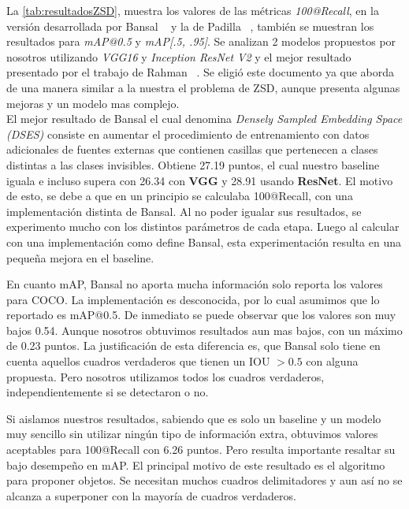 La \autoref{tab:resultadosZSD}, muestra los valores de las métricas \textit{100@Recall}, en la versión desarrollada por Bansal  \etal~\cite{bansal2018zero} y la de Padilla \etal~\cite{padilla2020survey}, también se muestran los resultados para \textit{mAP@0.5} y \textit{ mAP[.5, .95]}. Se analizan 2 modelos propuestos por nosotros utilizando \textit{VGG16} y \textit{Inception ResNet V2} y el mejor resultado presentado por el trabajo de Rahman \etal~\cite{rahman2020zero}. Se eligió este documento ya que aborda de una manera similar a la nuestra el problema de ZSD, aunque presenta algunas mejoras y un modelo mas complejo.\\

El mejor resultado de Bansal el cual denomina \textit{Densely Sampled Embedding Space (DSES)} consiste en aumentar el procedimiento de entrenamiento con datos adicionales de fuentes externas que contienen casillas que pertenecen a clases distintas a las clases invisibles. Obtiene 27.19 puntos, el cual nuestro baseline iguala e incluso supera con 26.34 con \textbf{VGG} y 28.91 usando \textbf{ResNet}. El motivo de esto, se debe a que en un principio se calculaba 100@Recall, con una implementación distinta de Bansal. Al no poder igualar sus resultados, se experimento mucho con los distintos parámetros de cada etapa. Luego al calcular con una implementación como define Bansal, esta experimentación resulta en una pequeña mejora en el baseline.

En cuanto mAP, Bansal no aporta mucha información solo reporta los valores para COCO. La implementación es desconocida, por lo cual asumimos que lo reportado es mAP@0.5. De inmediato se puede observar que los valores son muy bajos 0.54. Aunque nosotros obtuvimos resultados aun mas bajos, con un máximo de 0.23 puntos. La justificación de esta diferencia es, que Bansal solo tiene en cuenta aquellos cuadros verdaderos que tienen un IOU $> 0.5$ con alguna propuesta. Pero nosotros utilizamos todos los cuadros verdaderos, independientemente si se detectaron o no. 
	
Si aislamos nuestros resultados, sabiendo que es solo un baseline y un modelo muy sencillo sin utilizar ningún tipo de información extra, obtuvimos valores aceptables para 100@Recall con 6.26 puntos. Pero resulta importante resaltar su bajo desempeño en mAP. El principal motivo de este resultado es el algoritmo para proponer objetos. Se necesitan muchos cuadros delimitadores y aun así no se alcanza a superponer con la mayoría de cuadros verdaderos.


